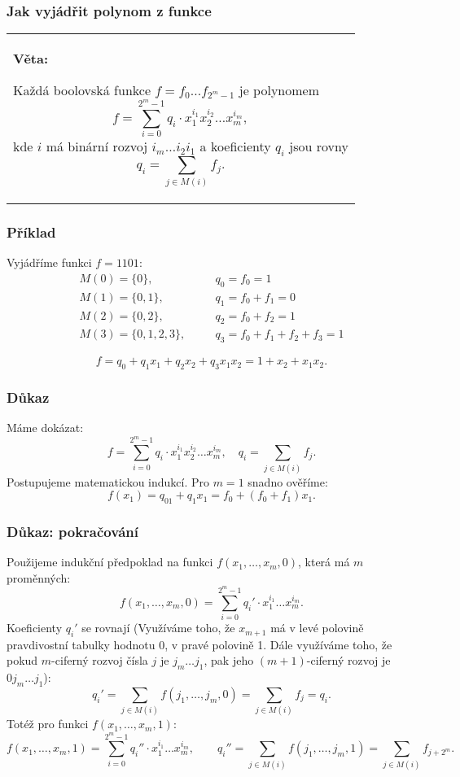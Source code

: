 \documentclass{beamer}
\newenvironment{veta}
{
    \begin{center}
    \begin{tabular}{p{9cm}}
    \textbf{Věta:}
}
{
    \end{tabular}
    \end{center}
}
\begin{document}
\begin{frame}[t,fragile]\frametitle{Jak vyjádřit polynom z funkce} 
\begin{veta}
 Každá boolovská funkce $f=f_0\dots f_{2^m-1}$ je polynomem
    $$
f = \sum_{i=0}^{2^{m}-1}q_i\cdot x_1^{i_1}x_2^{i_2}\dots x_m^{i_m},
    $$
    kde $i$ má binární rozvoj $i_m\dots i_2i_1$ a koeficienty $q_i$ jsou rovny
    $$
    q_i=\sum_{j\in M(i)}f_j.
    $$
\end{veta}
\end{frame}


\begin{frame}[t,fragile]\frametitle{Příklad} 
    Vyjádříme funkci $f=1101$:
    \begin{eqnarray*}
    M(0)=\{0\},\quad&& q_0= f_0=1\\
    M(1)=\{0,1\},\quad&& q_1= f_0+f_1=0\\
    M(2)=\{0,2\},\quad&& q_2= f_0+f_2=1\\
    M(3)=\{0,1,2,3\},\quad&&q_3=f_0+f_1+f_2+f_3=1
    \end{eqnarray*}

    $$
f=q_0+q_1x_1+q_2x_2+q_3x_1x_2=1+x_2+x_1x_2.
    $$
\end{frame}


\begin{frame}[t,fragile]\frametitle{Důkaz} 
Máme dokázat:
$$
f = \sum_{i=0}^{2^{m}-1}q_i\cdot x_1^{i_1}x_2^{i_2}\dots x_m^{i_m},\quad q_i=\sum_{j\in M(i)}f_j.
$$
Postupujeme matematickou indukcí. Pro $m=1$ snadno ověříme:
$$
f(x_1) = q_01+q_1x_1=f_0+(f_0+f_1)x_1.
$$

\end{frame}


\begin{frame}[t,fragile]\frametitle{Důkaz: pokračování} 
\footnotesize
Použijeme indukční předpoklad na funkci $f(x_1,\dots,x_m,0)$, která má $m$ proměnných:
$$
f(x_1,\dots,x_m,0)=\sum_{i=0}^{2^m-1}q_i'\cdot x_1^{i_1}\dots x_m^{i_m}.
$$
Koeficienty $q_i'$ se rovnají (Využíváme toho, že $x_{m+1}$ má v levé polovině pravdivostní tabulky hodnotu 0, v pravé polovině 1. Dále využíváme toho, že pokud $m$-ciferný rozvoj čísla $j$ je $j_m\dots j_1$, pak jeho $(m+1)$-ciferný rozvoj je $0j_m\dots j_1$):
$$
q_i'=\sum_{j\in M(i)} f(j_1,\dots,j_m,0) =\sum_{j\in M(i)}f_j=q_i.
$$
Totéž pro funkci $f(x_1,\dots,x_m,1)$:
$$
f(x_1,\dots,x_m,1)=\sum_{i=0}^{2^m-1}q_i''\cdot x_1^{i_1}\dots x_m^{i_m},\qquad q_i''=\sum_{j\in M(i)} f(j_1,\dots,j_m,1) =\sum_{j\in M(i)}f_{j+2^m}.
$$
\end{frame}
\end{document}
